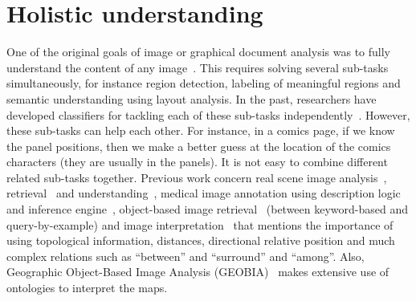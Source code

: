 



\section{Holistic understanding} %
\label{sec:sota:holistic_understanding}

One of the original goals of image or graphical document analysis was to fully understand the content of any image~\cite{Lamiroy2014Handbook}.
This requires solving several sub-tasks simultaneously, for instance region detection, labeling of meaningful regions and semantic understanding using layout analysis.
In the past, researchers have developed classifiers for tackling each of these sub-tasks independently~\cite{Mao2003Document}.
However, these sub-tasks can help each other.
For instance, in a comics page, if we know the panel positions, then we make a better guess at the location of the comics characters (they are usually in the panels).
It is not easy to combine different related sub-tasks together.
Previous work concern real scene image analysis~\cite{Blaschke2014Geographic}, retrieval~\cite{Sciascio2011Structured} and understanding~\cite{Li2012Toward,Fidler2012Describing}, medical image annotation using description logic and inference engine~\cite{Hu2003Ontology}, object-based image retrieval~\cite{Mezaris03anontology,Sarwar2013Ontology} (between keyword-based and query-by-example) and image interpretation~\cite{Hudelot2008Fuzzy,Ogier2000Semantic} that mentions the importance of using topological information, distances, directional relative position and much complex relations such as ``between'' and ``surround'' and ``among''.
Also, Geographic Object-Based Image Analysis (GEOBIA)~\cite{Blaschke2014Geographic} makes extensive use of ontologies to interpret the maps.

